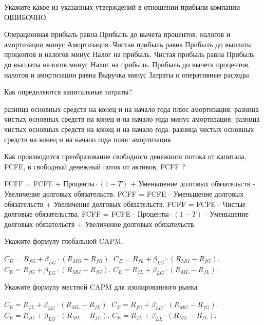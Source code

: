 \documentclass[12pt, table]{exam}
\begin{document}
\begin{questions}
\begin{multicols}{2}
\question Укажите какое из указанных утверждений в отношении прибыли компании ОШИБОЧНО.
\begin{choices}
	\choice Операционная прибыль равна Прибыль до вычета процентов, налогов и амортизации минус Амортизация.
	\CC Чистая прибыль равна Прибыль до выплаты процентов и налогов минус Налог на прибыль.
	\choice Чистая прибыль равна Прибыль до выплаты налогов минус Налог на прибыль.
	\choice Прибыль до вычета процентов, налогов и амортизации равна Выручка минус Затраты и оперативные расходы.
\end{choices}

\question Как определяются капитальные затраты?
\begin{choices}
	\choice разница основных средств на конец и на начало года плюс амортизация.
	\choice разница чистых основных средств на конец и на начало года минус амортизация.
	\choice разница чистых основных средств на конец и на начало года.
	\CC разница чистых основных средств на конец и на начало года плюс амортизация. 
\end{choices}

\question Как производится преобразование свободного денежного потока от капитала, FCFE, в свободный денежный поток от активов, FCFF ?
\begin{choices}
	\CC FCFF = FCFE + $\text{Проценты} \cdot (1-T)$ + Уменьшение долговых обязательств - Увеличение долговых обязательств. 
	\choice FCFF = FCFE - Уменьшение долговых обязательств + Увеличение долговых обязательств.
	\choice FCFF = FCFE - Чистые долговые обязательства.
	\choice FCFF = FCFE - $\text{Проценты} \cdot (1-T)$ - Уменьшение долговых обязательств + Увеличение долговых обязательств.
\end{choices}

\question Укажите формулу глобальной CAPM.
\begin{choices}
	\choice $C_D=R_{fG}+\beta_{LG} \cdot (R_{MG}-R_{fG})$.
	\choice $C_E=R_{fL}+\beta_{LG} \cdot (R_{MG}-R_{fG})$.
	\CC $C_E=R_{fG}+\beta_{LG} \cdot (R_{MG}-R_{fG})$.
	\choice $C_E=R_{fL}+\beta_{LG} \cdot (R_{ML}-R_{fL})$.
\end{choices}

\question Укажите формулу местной CAPM для изолированного рынка
\begin{choices}
	\choice $C_E=R_{fL}+\beta_{LG} \cdot (R_{ML}-R_{fL})$.
	\choice $C_E=R_{fG}+\beta_{LG} \cdot (R_{MG}-R_{fG})$. 
	\choice $C_E=R_{fG}+\beta_{LG} \cdot (R_{ML}-R_{fL})$.
	\CC $C_E=R_{fL}+\beta_{LL} \cdot (R_{ML}-R_{fL})$.
\end{choices}


\end{multicols}
\end{questions}
\end{document}
